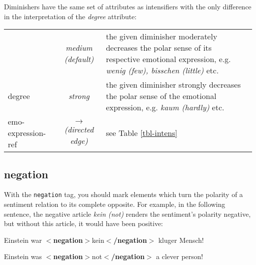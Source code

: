 \documentclass[11pt,a4paper]{article}
\newcommand{\xmltag}[1]{{\textbf{\small$<$#1$>$}}}
\newcommand{\negation}[1]{\xmltag{negation}#1\xmltag{/negation}}
\newlength\clmnwidth
\newenvironment{myexe}{
  \begin{exe}
    \ex\begin{center}
    \itshape
}{
    \end{center}
  \end{exe}
}
\begin{document}
Diminishers have the same set of attributes as intensifiers with the only
difference in the interpretation of the \textit{degree} attribute:
\begin{center}
  \begin{tabular}{|l|c|p{\clmnwidth}|}\hline\label{tbl-dimin}

    & \textit{medium (default)} & the given diminisher moderately
    decreases the polar sense of its respective emotional expression,
    e.g. \textit{wenig (few), bisschen (little)} etc.\\\cline{2-3}

    \multirow{-2}{*}{degree} & \textit{strong} & the given diminisher
    strongly decreases the polar sense of the emotional expression,
    e.g. \textit{kaum (hardly)} etc.\\\hline

    emo-expression-ref & \textit{$\longrightarrow$\newline(directed
      edge)} & see Table \ref{tbl-intens}\\\hline
  \end{tabular}
\end{center}

\subsection{negation}
With the \texttt{negation} tag, you should mark elements which turn
the polarity of a sentiment relation to its complete opposite.  For
example, in the following sentence, the negative article \textit{kein
  (not)} renders the sentiment's polarity negative, but without this
article, it would have been positive:
\begin{myexe}
Einstein war \negation{kein} kluger Mensch!\label{ex:negation}

Einstein was \negation{not} a clever person!
\end{myexe}
\end{document}
